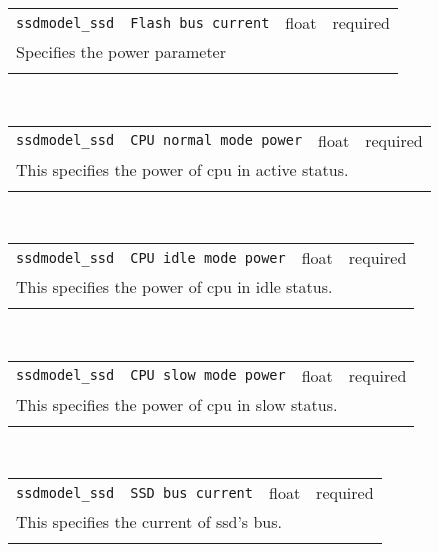 \noindent 
\begin{tabular}{|p{\lpmodwidth}|p{\lpnamewidth}|p{0.5in}|p{0.5in}|}
\cline{1-4}
\texttt{ssdmodel\_ssd} & \texttt{Flash bus current} & float & required \\ 
\cline{1-4}
\multicolumn{4}{|p{6in}|}{
Specifies the power parameter
}\\ 
\cline{1-4}
\multicolumn{4}{p{5in}}{}\\
\end{tabular}\\ 
\noindent 
\begin{tabular}{|p{\lpmodwidth}|p{\lpnamewidth}|p{0.5in}|p{0.5in}|}
\cline{1-4}
\texttt{ssdmodel\_ssd} & \texttt{CPU normal mode power} & float & required \\ 
\cline{1-4}
\multicolumn{4}{|p{6in}|}{
This specifies the power of cpu in active status.
}\\ 
\cline{1-4}
\multicolumn{4}{p{5in}}{}\\
\end{tabular}\\ 
\noindent 
\begin{tabular}{|p{\lpmodwidth}|p{\lpnamewidth}|p{0.5in}|p{0.5in}|}
\cline{1-4}
\texttt{ssdmodel\_ssd} & \texttt{CPU idle mode power} & float & required \\ 
\cline{1-4}
\multicolumn{4}{|p{6in}|}{
This specifies the power of cpu in idle status.
}\\ 
\cline{1-4}
\multicolumn{4}{p{5in}}{}\\
\end{tabular}\\ 
\noindent 
\begin{tabular}{|p{\lpmodwidth}|p{\lpnamewidth}|p{0.5in}|p{0.5in}|}
\cline{1-4}
\texttt{ssdmodel\_ssd} & \texttt{CPU slow mode power} & float & required \\ 
\cline{1-4}
\multicolumn{4}{|p{6in}|}{
This specifies the power of cpu in slow status.
}\\ 
\cline{1-4}
\multicolumn{4}{p{5in}}{}\\
\end{tabular}\\ 
\noindent 
\begin{tabular}{|p{\lpmodwidth}|p{\lpnamewidth}|p{0.5in}|p{0.5in}|}
\cline{1-4}
\texttt{ssdmodel\_ssd} & \texttt{SSD bus current} & float & required \\ 
\cline{1-4}
\multicolumn{4}{|p{6in}|}{
This specifies the current of ssd's bus.
}\\ 
\cline{1-4}
\multicolumn{4}{p{5in}}{}\\
\end{tabular}\\ 
